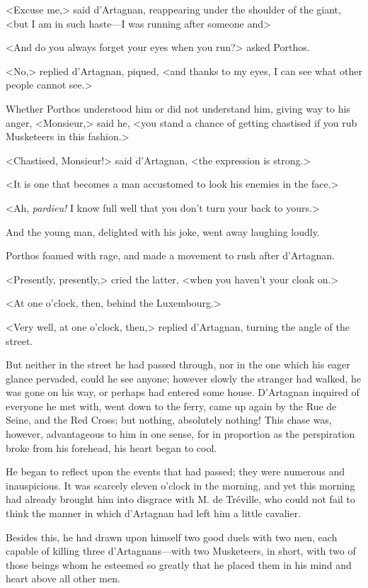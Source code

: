 <Excuse me,> said d'Artagnan, reappearing under the shoulder of the giant, <but I am in such haste---I was running after someone and\longdash> 

<And do you always forget your eyes when you run?> asked Porthos. 

<No,> replied d'Artagnan, piqued, <and thanks to my eyes, I can see what other people cannot see.> 

Whether Porthos understood him or did not understand him, giving way to his anger, <Monsieur,> said he, <you stand a chance of getting chastised if you rub Musketeers in this fashion.> 

<Chastised, Monsieur!> said d'Artagnan, <the expression is strong.> 

<It is one that becomes a man accustomed to look his enemies in the face.> 

<Ah, \textit{pardieu!} I know full well that you don't turn your back to yours.> 

And the young man, delighted with his joke, went away laughing loudly. 

Porthos foamed with rage, and made a movement to rush after d'Artagnan. 

<Presently, presently,> cried the latter, <when you haven't your cloak on.> 

<At one o'clock, then, behind the Luxembourg.> 

<Very well, at one o'clock, then,> replied d'Artagnan, turning the angle of the street. 

But neither in the street he had passed through, nor in the one which his eager glance pervaded, could he see anyone; however slowly the stranger had walked, he was gone on his way, or perhaps had entered some house. D'Artagnan inquired of everyone he met with, went down to the ferry, came up again by the Rue de Seine, and the Red Cross; but nothing, absolutely nothing! This chase was, however, advantageous to him in one sense, for in proportion as the perspiration broke from his forehead, his heart began to cool. 

He began to reflect upon the events that had passed; they were numerous and inauspicious. It was scarcely eleven o'clock in the morning, and yet this morning had already brought him into disgrace with M. de Tréville, who could not fail to think the manner in which d'Artagnan had left him a little cavalier. 

Besides this, he had drawn upon himself two good duels with two men, each capable of killing three d'Artagnans---with two Musketeers, in short, with two of those beings whom he esteemed so greatly that he placed them in his mind and heart above all other men. 


